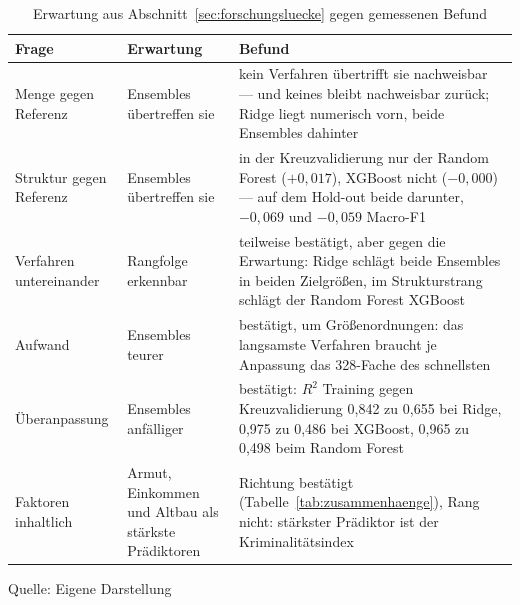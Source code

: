 \documentclass[12pt,a4paper]{article}
\renewcommand{\footnotesize}{\fontsize{10pt}{12pt}\selectfont}
\newcommand{\tabformat}{%
  \centering
  \singlespacing
  \footnotesize
  \setlength{\tabcolsep}{5pt}%
  \renewcommand{\arraystretch}{1.15}%
}
\newcommand{\tabquelle}[1][Eigene Darstellung]{%
  \par\setlength{\parskip}{0pt}\vspace{3pt}%
  {\setstretch{1}\fontsize{9pt}{11pt}\selectfont\raggedright Quelle: #1\par}%
}
\begin{document}
\begin{table}[htbp]
\tabformat
\caption{Erwartung aus Abschnitt~\ref{sec:forschungsluecke} gegen gemessenen Befund}
\label{tab:erwartung}
\begin{tabularx}{\textwidth}{@{}L{2.4cm} L{3.3cm} Y@{}}
\toprule
\textbf{Frage} & \textbf{Erwartung} & \textbf{Befund} \\
\midrule
Menge gegen Referenz & Ensembles übertreffen sie & kein Verfahren übertrifft sie nachweisbar --- und keines bleibt nachweisbar zurück; Ridge liegt numerisch vorn, beide Ensembles dahinter \\
\addlinespace
Struktur gegen Referenz & Ensembles übertreffen sie & in der Kreuzvalidierung nur der Random Forest ($+0{,}017$), XGBoost nicht ($-0{,}000$) --- auf dem Hold-out beide darunter, $-0{,}069$ und $-0{,}059$ Macro-F1 \\
\addlinespace
Verfahren untereinander & Rangfolge erkennbar & teilweise bestätigt, aber gegen die Erwartung: Ridge schlägt beide Ensembles in beiden Zielgrößen, im Strukturstrang schlägt der Random Forest XGBoost \\
\addlinespace
Aufwand & Ensembles teurer & bestätigt, um Größenordnungen: das langsamste Verfahren braucht je Anpassung das 328-Fache des schnellsten \\
\addlinespace
Überanpassung & Ensembles anfälliger & bestätigt: $R^2$ Training gegen Kreuzvalidierung 0,842 zu 0,655 bei Ridge, 0,975 zu 0,486 bei XGBoost, 0,965 zu 0,498 beim Random Forest \\
\addlinespace
Faktoren inhaltlich & Armut, Einkommen und Altbau als stärkste Prädiktoren & Richtung
bestätigt (Tabelle~\ref{tab:zusammenhaenge}), Rang nicht: stärkster Prädiktor ist der
Kriminalitätsindex \\
\bottomrule
\end{tabularx}
\tabquelle
\end{table}
\end{document}
